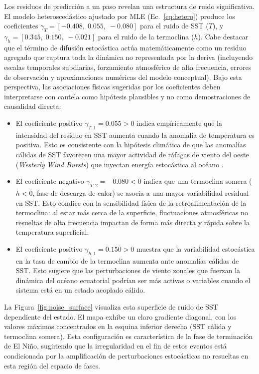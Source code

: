 \documentclass[11pt,a4paper]{article}
\begin{document}
Los residuos de predicción a un paso revelan una estructura de ruido significativa. El modelo heteroscedástico ajustado por MLE (Ec.~\ref{eq:hetero}) produce los coeficientes $\gamma_T = [-0.408,\; 0.055,\; -0.080]$ para el ruido de SST ($T$), y $\gamma_h = [0.345,\; 0.150,\; -0.021]$ para el ruido de la termoclina ($h$). Cabe destacar que el término de difusión estocástica actúa matemáticamente como un residuo agregado que captura toda la dinámica no representada por la deriva (incluyendo escalas temporales subdiarias, forzamiento atmosférico de alta frecuencia, errores de observación y aproximaciones numéricas del modelo conceptual). Bajo esta perspectiva, las asociaciones físicas sugeridas por los coeficientes deben interpretarse con cautela como hipótesis plausibles y no como demostraciones de causalidad directa:
\begin{itemize}
  \item El coeficiente positivo $\gamma_{T,1} = 0.055 > 0$ indica empíricamente que la intensidad del residuo en SST aumenta cuando la anomalía de temperatura es positiva. Esto es consistente con la hipótesis climática de que las anomalías cálidas de SST favorecen una mayor actividad de ráfagas de viento del oeste (\textit{Westerly Wind Bursts}) que inyectan energía estocástica al océano \citep{eisenman2005}.
  \item El coeficiente negativo $\gamma_{T,2} = -0.080 < 0$ indica que una termoclina somera ($h < 0$, fase de descarga de calor) se asocia a una mayor variabilidad residual en SST. Esto condice con la sensibilidad física de la retroalimentación de la termoclina: al estar más cerca de la superficie, fluctuaciones atmosféricas no resueltas de alta frecuencia impactan de forma más directa y rápida sobre la temperatura superficial.
  \item El coeficiente positivo $\gamma_{h,1} = 0.150 > 0$ muestra que la variabilidad estocástica en la tasa de cambio de la termoclina aumenta ante anomalías cálidas de SST. Esto sugiere que las perturbaciones de viento zonales que fuerzan la dinámica del océano ecuatorial podrían ser más activas o variables cuando el sistema está en un estado acoplado cálido.
\end{itemize}

La Figura~\ref{fig:noise_surface} visualiza esta superficie de ruido de SST dependiente del estado. El mapa exhibe un claro gradiente diagonal, con los valores máximos concentrados en la esquina inferior derecha (SST cálida y termoclina somera). Esta configuración es característica de la fase de terminación de El Niño, sugiriendo que la irregularidad en el fin de estos eventos está condicionada por la amplificación de perturbaciones estocásticas no resueltas en esta región del espacio de fases.
\end{document}
